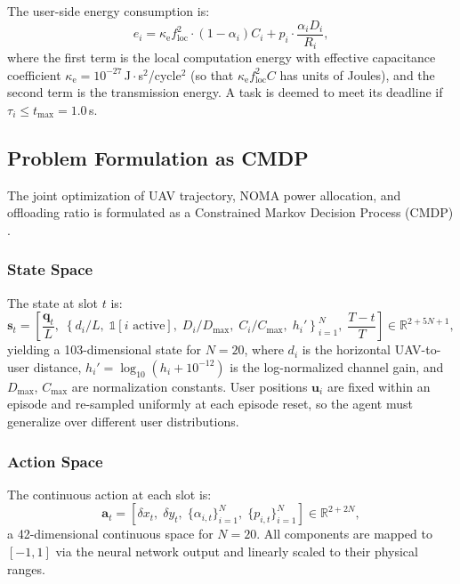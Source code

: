 \documentclass[journal]{IEEEtran}
\begin{document}
The user-side energy consumption is:
\begin{equation}
  e_i = \kappa_{\text{e}} f_{\text{loc}}^2 \cdot (1-\alpha_i) C_i
      + p_i \cdot \frac{\alpha_i D_i}{R_i},
  \label{eq:energy}
\end{equation}
where the first term is the local computation energy
with effective capacitance coefficient
$\kappa_{\text{e}} = 10^{-27}$\,J\,$\cdot$\,s$^2$/cycle$^2$
(so that $\kappa_{\text{e}} f_{\text{loc}}^2 C$ has units of Joules),
and the second term is the transmission energy.
A task is deemed to meet its deadline if $\tau_i \le t_{\max} = 1.0$\,s.

\subsection{Problem Formulation as CMDP}

The joint optimization of UAV trajectory, NOMA power allocation,
and offloading ratio is formulated as a Constrained Markov Decision
Process (CMDP) \cite{altman1999cmdp}.

\subsubsection{State Space}
The state at slot $t$ is:
\begin{equation}
  \bm{s}_t = \left[\frac{\bm{q}_t}{L},\;
    \left\{d_i/L,\; \mathbb{1}[i\text{ active}],\;
           D_i/D_{\max},\; C_i/C_{\max},\;
           h_i'\right\}_{i=1}^N,\;
    \frac{T-t}{T}\right] \in \mathbb{R}^{2+5N+1},
  \label{eq:state}
\end{equation}
yielding a 103-dimensional state for $N = 20$,
where $d_i$ is the horizontal UAV-to-user distance,
$h_i' = \log_{10}(h_i + 10^{-12})$ is the log-normalized channel
gain, and $D_{\max}$, $C_{\max}$ are normalization constants.
User positions $\bm{u}_i$ are fixed within an episode and
re-sampled uniformly at each episode reset, so the agent must
generalize over different user distributions.

\subsubsection{Action Space}
The continuous action at each slot is:
\begin{equation}
  \bm{a}_t = \left[\delta x_t,\; \delta y_t,\;
    \{\alpha_{i,t}\}_{i=1}^N,\; \{p_{i,t}\}_{i=1}^N\right]
    \in \mathbb{R}^{2+2N},
  \label{eq:action}
\end{equation}
a 42-dimensional continuous space for $N = 20$.
All components are mapped to $[-1,1]$ via the neural network
output and linearly scaled to their physical ranges.
\end{document}
